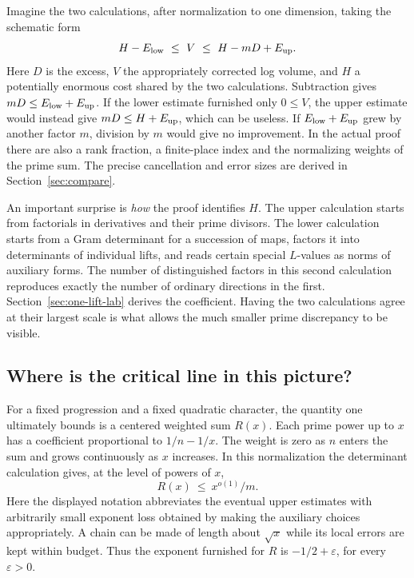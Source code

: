 \documentclass[11pt,letterpaper]{article}
\begin{document}
Imagine the two calculations, after normalization to one dimension, taking the schematic form
\[
    H-E_{\rm low}\ \le\ V\ \le\ H-mD+E_{\rm up}.
\]
Here \(D\) is the excess, \(V\) the appropriately corrected log volume, and \(H\) a potentially enormous cost shared by the two calculations. Subtraction gives \(mD\le E_{\rm low}+E_{\rm up}\). If the lower estimate furnished only \(0\le V\), the upper estimate would instead give \(mD\le H+E_{\rm up}\), which can be useless. If \(E_{\rm low}+E_{\rm up}\) grew by another factor \(m\), division by \(m\) would give no improvement. In the actual proof there are also a rank fraction, a finite-place index and the normalizing weights of the prime sum. The precise cancellation and error sizes are derived in Section~\ref{sec:compare}.

An important surprise is \emph{how} the proof identifies \(H\). The upper calculation starts from factorials in derivatives and their prime divisors. The lower calculation starts from a Gram determinant for a succession of maps, factors it into determinants of individual lifts, and reads certain special \(L\)-values as norms of auxiliary forms. The number of distinguished factors in this second calculation reproduces exactly the number of ordinary directions in the first. Section~\ref{sec:one-lift-lab} derives the coefficient. Having the two calculations agree at their largest scale is what allows the much smaller prime discrepancy to be visible.

\subsection*{Where is the critical line in this picture?}
For a fixed progression and a fixed quadratic character, the quantity one ultimately bounds is a centered weighted sum \(R(x)\). Each prime power up to \(x\) has a coefficient proportional to \(1/n-1/x\). The weight is zero as \(n\) enters the sum and grows continuously as \(x\) increases. In this normalization the determinant calculation gives, at the level of powers of \(x\),
\[
                       R(x)\ \le\ x^{o(1)}/m .
\]
Here the displayed notation abbreviates the eventual upper estimates with arbitrarily small exponent loss obtained by making the auxiliary choices appropriately. A chain can be made of length about \(\sqrt{x}\) while its local errors are kept within budget. Thus the exponent furnished for \(R\) is \(-1/2+\varepsilon\), for every \(\varepsilon>0\).
\end{document}
